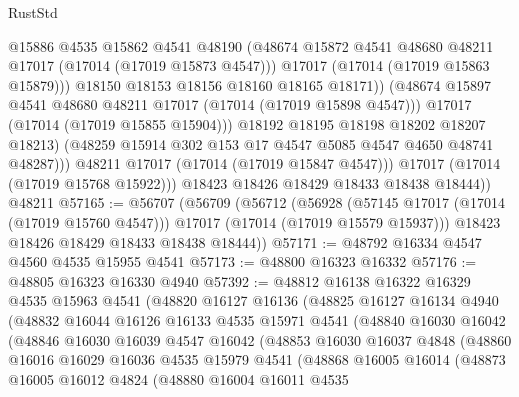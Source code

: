 \begin{lexlean}{RustStd}
\begin{coremodule}
                          @15886
                          @4535
                          @15862
                          @4541
                          @48190
                          (@48674 @15872 @4541 @48680 @48211 @17017 (@17014 (@17019 @15873 @4547)))
                          @17017
                          (@17014 (@17019 @15863 @15879)))
                        @18150
                        @18153
                        @18156
                        @18160
                        @18165
                        @18171))
                    (@48674 @15897 @4541 @48680 @48211 @17017 (@17014 (@17019 @15898 @4547)))
                    @17017
                    (@17014 (@17019 @15855 @15904)))
                  @18192
                  @18195
                  @18198
                  @18202
                  @18207
                  @18213)
                (@48259 @15914 @302 @153 @17 @4547 @5085 @4547 @4650 @48741 @48287)))
            @48211
            @17017
            (@17014 (@17019 @15847 @4547)))
          @17017
          (@17014 (@17019 @15768 @15922)))
        @18423
        @18426
        @18429
        @18433
        @18438
        @18444))
    @48211
@57165 := @56707
    (@56709
      (@56712
        (@56928
          (@57145 @17017 (@17014 (@17019 @15760 @4547)))
          @17017
          (@17014 (@17019 @15579 @15937)))
        @18423
        @18426
        @18429
        @18433
        @18438
        @18444))
@57171 := @48792 @16334 @4547 @4560 @4535 @15955 @4541
@57173 := @48800 @16323 @16332
@57176 := @48805 @16323 @16330 @4940
@57392 := @48812
    @16138
    @16322
    @16329
    @4535
    @15963
    @4541
    (@48820
      @16127
      @16136
      (@48825
        @16127
        @16134
        @4940
        (@48832
          @16044
          @16126
          @16133
          @4535
          @15971
          @4541
          (@48840
            @16030
            @16042
            (@48846
              @16030
              @16039
              @4547
              @16042
              (@48853
                @16030
                @16037
                @4848
                (@48860
                  @16016
                  @16029
                  @16036
                  @4535
                  @15979
                  @4541
                  (@48868
                    @16005
                    @16014
                    (@48873
                      @16005
                      @16012
                      @4824
                      (@48880
                        @16004
                        @16011
                        @4535

\end{coremodule}
\end{lexlean}
